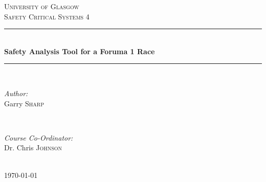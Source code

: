 \documentclass[12pt]{article} %
\begin{document}

\begin{titlepage}

\newcommand{\HRule}{\rule{\linewidth}{0.5mm}} %

\center %

\textsc{\LARGE University of Glasgow}\\[1.5cm] %
\textsc{\Large Safety Critical Systems 4}\\[0.5cm] %

\HRule \\[0.4cm]
{ \huge \bfseries Safety Analysis Tool for a Foruma 1 Race }\\[0.4cm] %
\HRule \\[1.5cm]

\begin{minipage}{0.4\textwidth}
\begin{flushleft} \large
\emph{Author:}\\
Garry \textsc{Sharp} %
\end{flushleft}
\end{minipage}
~
\begin{minipage}{0.4\textwidth}
\begin{flushright} \large
\emph{Course Co-Ordinator:} \\
Dr. Chris \textsc{Johnson} %
\end{flushright}
\end{minipage}\\[4cm]

{\large \today}\\[3cm] %


\vfill %

\end{titlepage}

\end{document}
